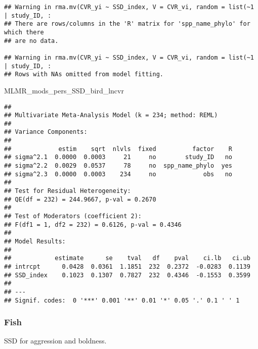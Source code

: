 \documentclass[]{article}
\newenvironment{Shaded}{\begin{snugshade}}{\end{snugshade}}
\newcommand{\NormalTok}[1]{#1}
\begin{document}
\begin{verbatim}
## Warning in rma.mv(CVR_yi ~ SSD_index, V = CVR_vi, random = list(~1 | study_ID, :
## There are rows/columns in the 'R' matrix for 'spp_name_phylo' for which there
## are no data.

## Warning in rma.mv(CVR_yi ~ SSD_index, V = CVR_vi, random = list(~1 | study_ID, :
## Rows with NAs omitted from model fitting.
\end{verbatim}

\begin{Shaded}
\begin{Highlighting}[]
\NormalTok{    MLMR_mods_pers_SSD_bird_lncvr}
\end{Highlighting}
\end{Shaded}

\begin{verbatim}
## 
## Multivariate Meta-Analysis Model (k = 234; method: REML)
## 
## Variance Components:
## 
##             estim    sqrt  nlvls  fixed          factor    R 
## sigma^2.1  0.0000  0.0003     21     no        study_ID   no 
## sigma^2.2  0.0029  0.0537     78     no  spp_name_phylo  yes 
## sigma^2.3  0.0000  0.0003    234     no             obs   no 
## 
## Test for Residual Heterogeneity:
## QE(df = 232) = 244.9667, p-val = 0.2670
## 
## Test of Moderators (coefficient 2):
## F(df1 = 1, df2 = 232) = 0.6126, p-val = 0.4346
## 
## Model Results:
## 
##            estimate      se    tval   df    pval    ci.lb   ci.ub 
## intrcpt      0.0428  0.0361  1.1851  232  0.2372  -0.0283  0.1139    
## SSD_index    0.1023  0.1307  0.7827  232  0.4346  -0.1553  0.3599    
## 
## ---
## Signif. codes:  0 '***' 0.001 '**' 0.01 '*' 0.05 '.' 0.1 ' ' 1
\end{verbatim}

\subsubsection{Fish}\label{fish}

SSD for aggression and boldness.
\end{document}
